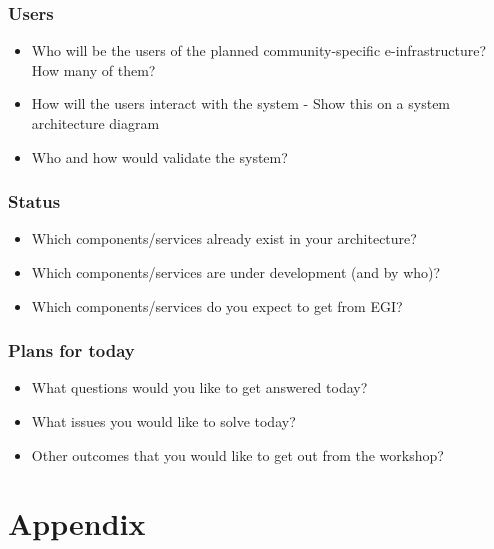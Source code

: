 \documentclass{beamer}
\begin{document}

   \begin{frame}
    \frametitle{Users}
    \begin{itemize}
      \item Who will be the users of the planned community-specific e-infrastructure? How many of them?
      \item How will the users interact with the system - Show this on a system architecture diagram
      \item Who and how would validate the system? 
    \end{itemize}
  \end{frame}


   \begin{frame}
    \frametitle{Status}
    \begin{itemize}
      \item Which components/services already exist in your architecture?
      \item Which components/services are under development (and by who)?
      \item Which components/services do you expect to get from EGI? 
    \end{itemize}
  \end{frame}


   \begin{frame}
    \frametitle{Plans for today}
    \begin{itemize}
      \item What questions would you like to get answered today?
      \item What issues you would like to solve today?
      \item Other outcomes that you would like to get out from the workshop? 
    \end{itemize}
  \end{frame}


  \appendix

  \section{Appendix}
  
\end{document}
